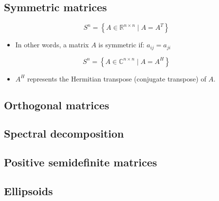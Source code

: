 \subsection{Symmetric matrices}
\begin{definition}
    \[
    S^n = \left\{ A \in \mathbb{R}^{n \times n} \mid A = A^T \right\}
    \]
    \begin{itemize}
        \item In other words, a matrix $A$ is symmetric if: $a_{ij} = a_{ji}$
    \end{itemize}

    \[
    S^n = \left\{ A \in \mathbb{C}^{n \times n} \mid A = A^H \right\}
    \]
    \begin{itemize}
        \item $A^H$ represents the Hermitian transpose (conjugate transpose) of $A$.
    \end{itemize}
    
\end{definition}

\subsection{Orthogonal matrices}
\subsection{Spectral decomposition}
\subsection{Positive semidefinite matrices}
\subsection{Ellipsoids}